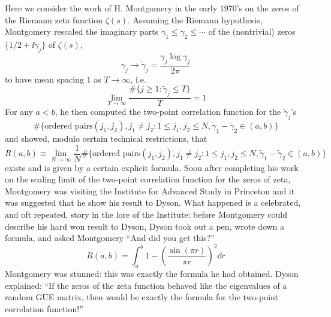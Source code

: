 
Here we consider the work of H. Montgomery in the early $1970$’s on the zeros of the Riemann zeta function $\zeta(s)$. Assuming the Riemann hypothesis, Montgomery rescaled the imaginary parts $\gamma_1 \leq \gamma_2 \leq \cdots$ of the (nontrivial) zeros $\{ 1/2 + \ii \gamma_j\}$ of $\zeta(s)$,
\[
\gamma_j \rightarrow \tilde{\gamma}_j = \frac{\gamma_j \log{\gamma_j}}{2\pi}
\]
to have mean spacing $1$ as $T \rightarrow \infty$, i.e.
\[
\lim_{T \rightarrow \infty} \frac{\#\{j \geq 1 : \tilde{\gamma}_j \leq T\}}{T} = 1
\]
For any $a < b$, he then computed the two-point correlation function for the $\tilde{\gamma}_j$’s
\[
\#\{\text{ordered pairs} (j_1, j_2), j_1 \neq j_2 : 1 \leq j_1, j_2 \leq N, \tilde{\gamma}_1 - \tilde{\gamma}_2 \in (a, b)\}
\]
and showed, modulo certain technical restrictions, that
\[
R(a, b) \equiv \lim_{N \rightarrow \infty}\frac{1}{N} \#\{\text{ordered pairs} (j_1, j_2), j_1 \neq j_2 : 1 \leq j_1, j_2 \leq N, \tilde{\gamma}_1 - \tilde{\gamma}_2 \in (a, b)\}
\]
exists and is given by a certain explicit formula. Soon after completing his work on the scaling limit of the two-point correlation function for the zeros of zeta, Montgomery was visiting the Institute for Advanced Study in Princeton and it was suggested that he show his result to Dyson. What happened is a celebrated, and oft repeated, story in the lore of the Institute: before Montgomery could describe his hard won result to Dyson, Dyson took out
a pen, wrote down a formula, and asked Montgomery “And did you get this?”
\[
R(a, b) = \int_{a}^{b} 1 - \left( \frac{\sin(\pi r)}{\pi r}\right)^2 \dd r
\]
Montgomery was stunned: this was exactly the formula he had obtained. Dyson explained: “If the zeros of the zeta function behaved like the eigenvalues of a random GUE matrix, then would be exactly the formula for the two-point correlation function!”
